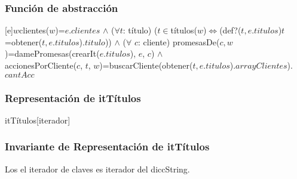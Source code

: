 \subsubsection{Funci\'on de abstracci\'on}
  	 [e]{$w$}{clientes($w$)=$e.clientes$ $\land$ ($\forall t$: t\'itulo) {\large(}$t \in$t\'itulos($w$)$\Leftrightarrow$(def?($t, e.titulos$)\yluego$t$=obtener($t, e.titulos$).$titulo$){\large)} $\land$ ($\forall$ $c$: cliente) promesasDe($c, w$)=damePromesas(crearIt($e.titulos$), $e$, $c$) $\land$ \\accionesPorCliente($c$, $t$, $w$)=buscarCliente(obtener($t, e.titulos$).$arrayClientes$).$cantAcc$}



\subsubsection{Representaci\'on de itT\'itulos}

\begin{Estructura}{itT\'itulos}[iterador]
    \begin{Tupla}[iterador]
      	
    \end{Tupla}

\end{Estructura}

\subsubsection{Invariante de Representaci\'on de itT\'itulos}
 \renewcommand{\labelenumi}{(\Roman{enumi})}
 Los el iterador de claves es iterador del diccString.

